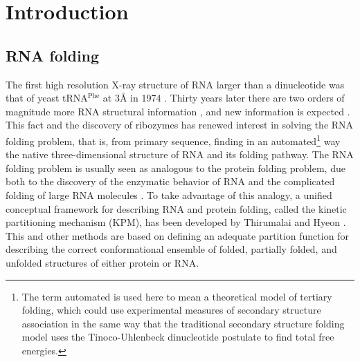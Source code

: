 \chapter{Introduction}
\label{introduction} 

\section{RNA folding}
The first  high resolution  X-ray structure of  RNA larger
than a dinucleotide was  that of yeast tRNA$^{\textrm{Phe}}$ at 3{\AA}
in 1974 \cite{robertus1974, kim1974}. Thirty years later there are two
orders    of    magnitude     more    RNA    structural    information
\cite{noller2005}, and new information is expected
\cite{weinberg2009}.   This  fact   and  the   discovery   of  ribozymes
\cite{kruger1982, takada1983} has renewed  interest in solving the RNA
folding problem, that  is, from  primary sequence,
finding in  an automated\footnote{The term  automated is used  here to
  mean  a  theoretical model  of  tertiary  folding,  which could  use
  experimental measures of secondary structure association in the same
  way   that  the  traditional   secondary  structure   folding  model
  \cite{zuker1989,    hofacker1994}    uses    the    Tinoco-Uhlenbeck
  dinucleotide   postulate  \cite{borer1974}   to   find  total   free
  energies.} way the native three-dimensional structure of RNA and its
folding pathway. The RNA folding problem is usually
seen  as analogous to  the protein  folding problem,  due both  to the
discovery   of  the  enzymatic   behavior  of   RNA  \cite{kruger1982,
  takada1983}  and  the complicated  folding  of  large RNA  molecules
\cite{batey1999}.  To  take  advantage  of  this  analogy,  a  unified
conceptual framework  for describing  RNA and protein  folding, called
the  kinetic  partitioning  mechanism  (KPM), has  been  developed  by
Thirumalai and Hyeon \cite{thirumalai2005}. This and other methods are
based on  defining an adequate  partition function for  describing the
correct  conformational  ensemble  of  folded, partially  folded,  and
unfolded  structures   \cite{chen1995,  chen1998,  thirumalai1996}  of
either protein or RNA.

